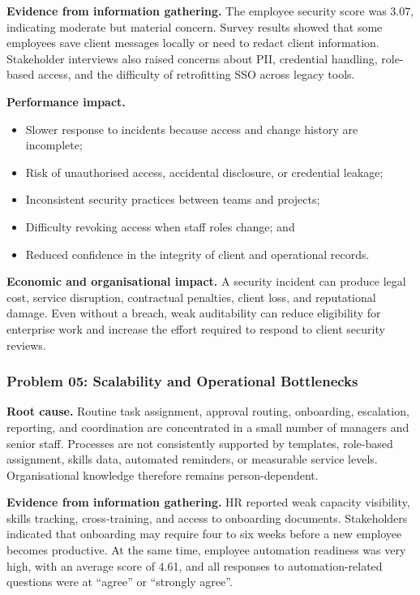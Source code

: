 \documentclass[12pt,a4paper]{report}
\begin{document}
\textbf{Evidence from information gathering.}
The employee security score was 3.07, indicating moderate but material concern. Survey results
showed that some employees save client messages locally or need to redact client information.
Stakeholder interviews also raised concerns about PII, credential handling, role-based access,
and the difficulty of retrofitting SSO across legacy tools.

\textbf{Performance impact.}
\begin{itemize}[leftmargin=1.6em]
    \item Slower response to incidents because access and change history are incomplete;
    \item Risk of unauthorised access, accidental disclosure, or credential leakage;
    \item Inconsistent security practices between teams and projects;
    \item Difficulty revoking access when staff roles change; and
    \item Reduced confidence in the integrity of client and operational records.
\end{itemize}

\textbf{Economic and organisational impact.}
A security incident can produce legal cost, service disruption, contractual penalties, client loss,
and reputational damage. Even without a breach, weak auditability can reduce eligibility for
enterprise work and increase the effort required to respond to client security reviews.

\subsubsection{Problem 05: Scalability and Operational Bottlenecks}\label{sec:rc-scale}

\textbf{Root cause.}
Routine task assignment, approval routing, onboarding, escalation, reporting, and coordination
are concentrated in a small number of managers and senior staff. Processes are not consistently
supported by templates, role-based assignment, skills data, automated reminders, or measurable
service levels. Organisational knowledge therefore remains person-dependent.

\textbf{Evidence from information gathering.}
HR reported weak capacity visibility, skills tracking, cross-training, and access to onboarding
documents. Stakeholders indicated that onboarding may require four to six weeks before a new
employee becomes productive. At the same time, employee automation readiness was very high,
with an average score of 4.61, and all responses to automation-related questions were at
``agree'' or ``strongly agree''.
\end{document}
